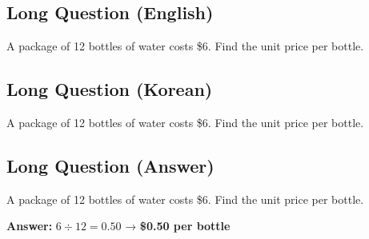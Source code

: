 \cleardoublepage
\subsection*{Long Question (English)}
A package of 12 bottles of water costs \$6. Find the unit price per bottle.


\newpage
\subsection*{Long Question (Korean)}
A package of 12 bottles of water costs \$6. Find the unit price per bottle.


\newpage
\subsection*{Long Question (Answer)}
A package of 12 bottles of water costs \$6. Find the unit price per bottle.

\textbf{Answer:} $6 \div 12 = 0.50$ → \textbf{\$0.50 per bottle}
